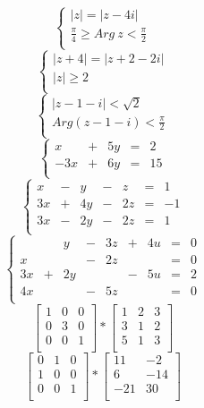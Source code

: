 \documentclass[12pt, letterpaper, titlepage]{article}
\begin{document}
$$\begin{cases}
|z|=|z-4i|\\
\frac{\pi}{4}\geq Arg \ z < \frac{\pi}{2}\\
\end{cases}$$
$$\begin{cases}
|z+4|=|z+2-2i|\\
|z| \geq 2\\
\end{cases}$$
$$\begin{cases}
|z-1-i| < \sqrt{2} \\
Arg(z-1-i) < \frac{\pi}{2}\\
\end{cases}$$
$$\left\{ \begin{array}{rrrrr}
x & + & 5y & = & 2\\
-3x & + & 6y & = & 15\\
\end{array}
\right.$$
$$\left\{ \begin{array}{rrrrrrr}
x & - & y & - & z & = & 1\\
3x & + & 4y & - & 2z & = & -1\\
3x & - & 2y & - & 2z & = & 1\\
\end{array}
\right.$$
$$\left\{ \begin{array}{rrrrrrrrr}
 & & y & - & 3z & + & 4u & = & 0\\
x & &  & - & 2z &  &  & = & 0\\
3x & + & 2y & & & - & 5u & = & 2\\
4x & & & - & 5z & & & = & 0\\
\end{array}
\right.$$
$$\mathbf{}
\left[ \begin{array}{ccc}
1 & 0 & 0 \\
0 & 3 & 0 \\
0 & 0 & 1 \\
\end{array} \right]
*
\mathbf{}
\left[ \begin{array}{ccc}
1 & 2 & 3 \\
3 & 1 & 2 \\
5 & 1 & 3 \\
\end{array} \right]
$$
$$\mathbf{}
\left[ \begin{array}{ccc}
0 & 1 & 0 \\
1 & 0 & 0 \\
0 & 0 & 1 \\
\end{array} \right]
*
\mathbf{}
\left[ \begin{array}{cc}
11 & -2 \\
6 & -14 \\
-21 & 30 \\
\end{array} \right]
$$
\end{document}
